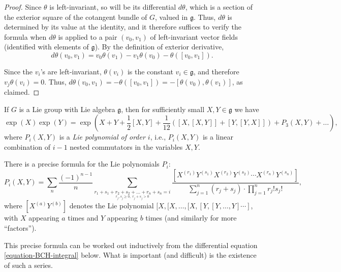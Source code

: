 \begin{proof}
 Since $\theta$ is left-invariant, so will be its differential $d\theta$, which is a section of the exterior square of the cotangent bundle of $G$, valued in $\mathfrak g$. Thus, $d\theta$ is determined by its value at the identity, and it therefore suffices to verify the formula when $d\theta$ is applied to a pair $(v_0,v_1)$ of left-invariant vector fields (identified with elements of $\mathfrak g$). By the definition of exterior derivative,
 $$ d\theta(v_0,v_1) = v_0 \theta(v_1) - v_1 \theta(v_0) - \theta([v_0,v_1]).$$
 
 Since the $v_i$'s are left-invariant, $\theta(v_i)$ is the constant $v_i\in \mathfrak g$, and therefore $v_j \theta(v_i)=0$. Thus, $d\theta(v_0,v_1) = - \theta([v_0,v_1]) = - [\theta(v_0), \theta(v_1)]$, as claimed.
\end{proof}



\begin{theorem} 
\label{theorem-Baker-Campbell-Hausdorff}
If $G$ is a Lie group with Lie algebra $\mathfrak g$, then for sufficiently small $X, Y\in \mathfrak g$ we have 
\begin{equation}
 \label{equation-BCH}
\exp(X) \exp(Y) = \exp(X+Y+ \frac{1}{2}[X,Y] + \frac{1}{12} ([X,[X,Y]]  + [Y, [Y,X]]) + P_3 (X,Y) + \dots),
\end{equation}
where $P_i(X,Y)$ is a \emph{Lie polynomial of order $i$}, i.e., $P_i(X, Y)$ is a linear combination of $i-1$ nested commutators in the variables $X, Y$. 
\end{theorem}

\begin{remark}
\label{remark-BCH-formula}
There is a precise formula for the Lie polynomials $P_i$:
\begin{equation}
\label{equation-BCHterms}
P_i(X,Y) = \sum_n \frac{(-1)^{n-1}}{n} \sum_{\underset{r_j, s_j \ge 0, \,\, r_j+s_j>0}{r_1+s_1+ r_2+s_2+ \dots+ r_n+s_n = i}} \frac{[X^{(r_1)} Y^{(s_1)} X^{(r_2)} Y^{(s_2)} \cdots X^{(r_n)} Y^{(s_n)}]}{\sum_{j=1}^n (r_j+s_j) \cdot \prod_{j=1}^n r_j! s_j!},
\end{equation}
where $[X^{(a)} Y^{(b)}]$ denotes the Lie polynomial $[X, [X, \dots, [X, [Y,[Y,\dots, Y]\cdots]$, with $X$ appearing $a$ times and $Y$ appearing $b$ times (and similarly for more ``factors'').

This precise formula can be worked out inductively from the differential equation \eqref{equation-BCH-integral} below. What is important (and difficult) is the existence of such a series.
\end{remark}



